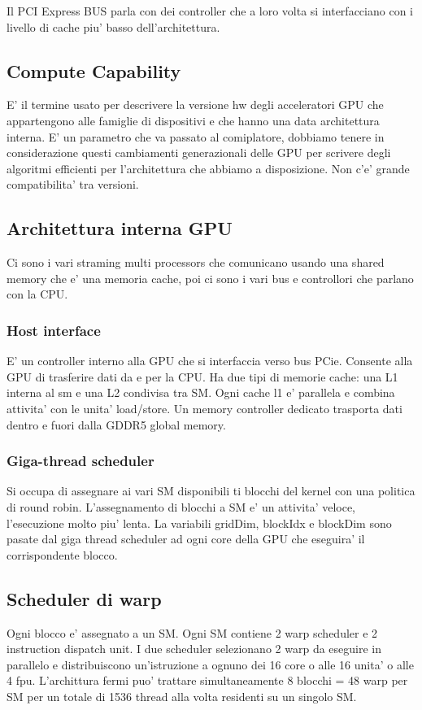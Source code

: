 Il PCI Express BUS parla con dei controller che a loro volta si interfacciano con i livello di cache piu' basso dell'architettura.

\subsection{Compute Capability}
E' il termine usato per descrivere la versione hw degli acceleratori GPU che appartengono alle famiglie di dispositivi e che hanno una data architettura interna. E' un parametro che va passato al comiplatore, dobbiamo tenere in considerazione questi cambiamenti generazionali delle GPU per scrivere degli algoritmi efficienti per l'architettura che abbiamo a disposizione.
Non c'e' grande compatibilita' tra versioni.

\subsection{Architettura interna GPU}
Ci sono i vari straming multi processors che comunicano usando una shared memory che e' una memoria cache, poi ci sono i vari bus e controllori che parlano con la CPU.

\subsubsection{Host interface}
E' un controller interno alla GPU che si interfaccia verso bus PCie. Consente alla GPU di trasferire dati da e per la CPU. Ha due tipi di memorie cache: una L1 interna al sm e una L2 condivisa tra SM. Ogni cache l1 e' parallela e combina attivita' con le unita' load/store. Un memory controller dedicato trasporta dati dentro e fuori dalla GDDR5 global memory.

\subsubsection{Giga-thread scheduler}
Si occupa di assegnare ai vari SM disponibili ti blocchi del kernel con una politica di round robin. 
L'assegnamento di blocchi a SM e' un attivita' veloce, l'esecuzione molto piu' lenta.
La variabili gridDim, blockIdx e blockDim sono pasate dal giga thread scheduler ad ogni core della GPU che eseguira' il corrispondente blocco.

\subsection{Scheduler di warp}
Ogni blocco e' assegnato a un SM. Ogni SM contiene 2 warp scheduler e 2 instruction dispatch unit. I due scheduler selezionano 2 warp da eseguire in parallelo e distribuiscono un'istruzione a ognuno dei 16 core o alle 16 unita' o alle 4 fpu. L'archittura fermi puo' trattare simultaneamente 8 blocchi = 48 warp per SM per un totale di 1536 thread alla volta residenti su un singolo SM.

